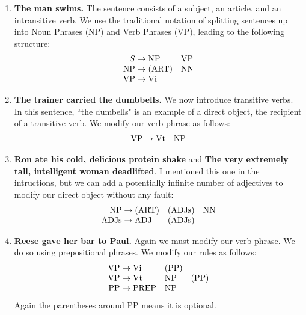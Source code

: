 \documentclass{article}
\newcommand{\ART}{\text{ART}}
\newcommand{\NP}{\text{NP}}
\newcommand{\NN}{\text{NN}}
\newcommand{\VP}{\text{VP}}
\newcommand{\Vi}{\text{Vi}}
\newcommand{\Vt}{\text{Vt}}
\newcommand{\ADJs}{\text{ADJs}}
\newcommand{\ADJ}{\text{ADJ}}
\newcommand{\PP}{\text{PP}}
\newcommand{\PREP}{\text{PREP}}
\begin{document}
\begin{enumerate}[label = \textbf{\arabic*.}]
    \item 
     \textbf{The man swims.} The sentence consists of a subject, an article, and an intransitive verb. We use the traditional notation of splitting sentences up into Noun Phrases (NP) and Verb Phrases (VP), leading to the following structure:
     $$\begin{array}{r@{ {}\rightarrow{} }lll}
        S & \NP & \VP \\
        \NP & (\ART) & \NN \\
        \VP & \Vi
    \end{array}$$
    \item \textbf{The trainer carried the dumbbells.} We now introduce transitive verbs. In this sentence, ``the dumbells" is an example of a direct object, the recipient of a transitive verb. We modify our verb phrase as follows:
    $$\begin{array}{r@{ {}\rightarrow{} }lll}
        \VP & \Vt & \NP
    \end{array}$$
    \item \textbf{Ron ate his cold, delicious protein shake} and \textbf{The very extremely tall, intelligent woman deadlifted}. I mentioned this one in the intructions, but we can add a potentially infinite number of adjectives to modify our direct object without any fault:
    $$\begin{array}{r@{ {}\rightarrow{} }lll}
        \NP & (\ART) & (\ADJs) & \NN \\
        \ADJs & \ADJ & (\ADJs)
    \end{array}$$
    \item \textbf{Reese gave her bar to Paul.} Again we must modify our verb phrase. We do so using prepositional phrases. We modify our rules as follows:
    $$\begin{array}{r@{ {}\rightarrow{} }lll}
        \VP & \Vi & (\PP) \\
        \VP & \Vt & \NP & (\PP) \\
        \PP & \PREP & \NP
    \end{array}$$
    Again the parentheses around $\PP$ means it is optional.


\end{enumerate}
\end{document}
